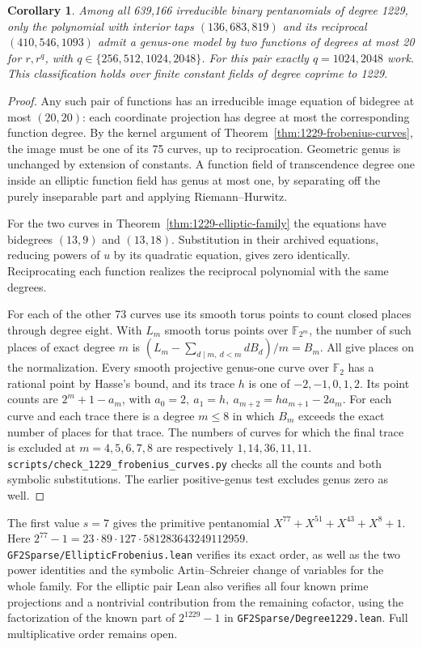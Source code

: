 \documentclass[11pt]{article}
\newtheorem{corollary}[theorem]{Corollary}
\newcommand{\F}{\mathbb F_2}
\begin{document}
\begin{corollary}\label{cor:1229-elliptic-only}
Among all 639,166 irreducible binary pentanomials of degree 1229,
only the polynomial with interior taps \((136,683,819)\) and its
reciprocal \((410,546,1093)\) admit a genus-one model by two functions
of degrees at most 20 for \(r,r^q\), with \(q\in\{256,512,1024,2048\}\).
For this pair exactly \(q=1024,2048\) work. This classification
holds over finite constant fields of degree coprime to 1229.
\end{corollary}
\begin{proof}
Any such pair of functions has an irreducible image equation of
bidegree at most \((20,20)\): each coordinate projection has degree
at most the corresponding function degree. By the kernel argument of
Theorem~\ref{thm:1229-frobenius-curves}, the image must be one of
its 75 curves, up to reciprocation. Geometric genus is unchanged by
extension of constants. A function field of transcendence degree one
inside an elliptic function field has genus at most one, by separating
off the purely inseparable part and applying Riemann--Hurwitz.

For the two curves in Theorem~\ref{thm:1229-elliptic-family} the
equations have bidegrees \((13,9)\) and \((13,18)\). Substitution in
their archived equations, reducing powers of \(u\) by its quadratic
equation, gives zero identically. Reciprocating each function realizes
the reciprocal polynomial with the same degrees.

For each of the other 73 curves use its smooth torus points to count
closed places through degree eight. With \(L_m\) smooth torus points
over \(\mathbb F_{2^m}\), the number of such places of exact degree
\(m\) is \((L_m-\sum_{d\mid m,\ d<m}d B_d)/m=B_m\).
All give places on the normalization. Every smooth projective
genus-one curve over \(\F\) has a rational point by Hasse's bound,
and its trace \(h\) is one of \(-2,-1,0,1,2\). Its point counts are
\(2^m+1-a_m\), with \(a_0=2,\ a_1=h,\ a_{m+2}=h a_{m+1}-2a_m\).
For each curve and each trace there is a degree \(m\le8\) in which
\(B_m\) exceeds the exact number of places for that trace. The numbers
of curves for which the final trace is excluded at \(m=4,5,6,7,8\)
are respectively \(1,14,36,11,11\).
\nolinkurl{scripts/check_1229_frobenius_curves.py} checks all the
counts and both symbolic substitutions. The earlier positive-genus
test excludes genus zero as well.
\end{proof}
The first value \(s=7\) gives the primitive pentanomial
\(X^{77}+X^{51}+X^{43}+X^8+1\). Here
\(2^{77}-1=23\cdot89\cdot127\cdot581283643249112959\).
\nolinkurl{GF2Sparse/EllipticFrobenius.lean} verifies its exact
order, as well as the two power identities and the symbolic
Artin--Schreier change of variables for the whole family.
For the elliptic pair Lean also verifies all four known prime
projections and a nontrivial contribution from the remaining cofactor,
using the factorization of the known part of \(2^{1229}-1\) in \nolinkurl{GF2Sparse/Degree1229.lean}.
Full multiplicative order remains open.
\end{document}
